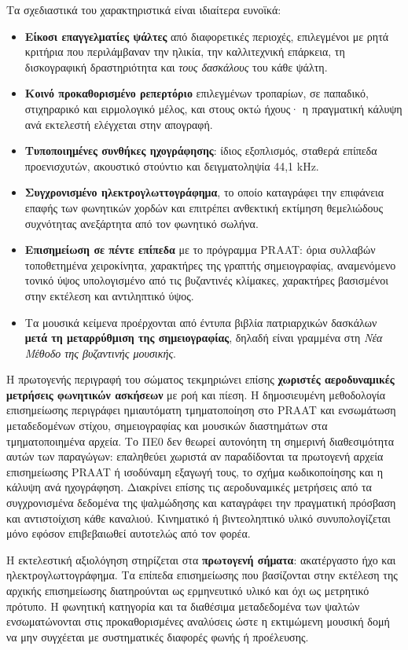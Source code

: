 \documentclass[11pt,a4paper]{article}
\begin{document}
Τα σχεδιαστικά του χαρακτηριστικά είναι ιδιαίτερα ευνοϊκά:
\begin{itemize}
\item \textbf{Είκοσι επαγγελματίες ψάλτες} από διαφορετικές περιοχές, επιλεγμένοι με ρητά κριτήρια που περιλάμβαναν την ηλικία, την καλλιτεχνική επάρκεια, τη δισκογραφική δραστηριότητα και \emph{τους δασκάλους} του κάθε ψάλτη.
\item \textbf{Κοινό προκαθορισμένο ρεπερτόριο} επιλεγμένων τροπαρίων, σε παπαδικό, στιχηραρικό και ειρμολογικό μέλος, και στους οκτώ ήχους· η πραγματική κάλυψη ανά εκτελεστή ελέγχεται στην απογραφή.
\item \textbf{Τυποποιημένες συνθήκες ηχογράφησης}: ίδιος εξοπλισμός, σταθερά επίπεδα προενισχυτών, ακουστικό στούντιο και δειγματοληψία 44,1 kHz.
\item \textbf{Συγχρονισμένο ηλεκτρογλωττογράφημα}, το οποίο καταγράφει την επιφάνεια επαφής των φωνητικών χορδών και επιτρέπει ανθεκτική εκτίμηση θεμελιώδους συχνότητας ανεξάρτητα από τον φωνητικό σωλήνα.
\item \textbf{Επισημείωση σε πέντε επίπεδα} με το πρόγραμμα PRAAT: όρια συλλαβών τοποθετημένα χειροκίνητα, χαρακτήρες της γραπτής σημειογραφίας, αναμενόμενο τονικό ύψος υπολογισμένο από τις βυζαντινές κλίμακες, χαρακτήρες βασισμένοι στην εκτέλεση και αντιληπτικό ύψος.
\item Τα μουσικά κείμενα προέρχονται από έντυπα βιβλία πατριαρχικών δασκάλων \textbf{μετά τη μεταρρύθμιση της σημειογραφίας}, δηλαδή είναι γραμμένα στη \emph{Νέα Μέθοδο της βυζαντινής μουσικής}.
\end{itemize}

Η πρωτογενής περιγραφή του σώματος τεκμηριώνει επίσης \textbf{χωριστές αεροδυναμικές μετρήσεις φωνητικών ασκήσεων} με ροή και πίεση. Η δημοσιευμένη μεθοδολογία επισημείωσης περιγράφει ημιαυτόματη τμηματοποίηση στο PRAAT και ενσωμάτωση μεταδεδομένων στίχου, σημειογραφίας και μουσικών διαστημάτων στα τμηματοποιημένα αρχεία. Το ΠΕ0 δεν θεωρεί αυτονόητη τη σημερινή διαθεσιμότητα αυτών των παραγώγων: επαληθεύει χωριστά αν παραδίδονται τα πρωτογενή αρχεία επισημείωσης PRAAT ή ισοδύναμη εξαγωγή τους, το σχήμα κωδικοποίησης και η κάλυψη ανά ηχογράφηση. Διακρίνει επίσης τις αεροδυναμικές μετρήσεις από τα συγχρονισμένα δεδομένα της ψαλμώδησης και καταγράφει την πραγματική πρόσβαση και αντιστοίχιση κάθε καναλιού. Κινηματικό ή βιντεοληπτικό υλικό συνυπολογίζεται μόνο εφόσον επιβεβαιωθεί αυτοτελώς από τον φορέα.

Η εκτελεστική αξιολόγηση στηρίζεται στα \textbf{πρωτογενή σήματα}: ακατέργαστο ήχο και ηλεκτρογλωττογράφημα. Τα επίπεδα επισημείωσης που βασίζονται στην εκτέλεση της αρχικής επισημείωσης διατηρούνται ως ερμηνευτικό υλικό και όχι ως μετρητικό πρότυπο. Η φωνητική κατηγορία και τα διαθέσιμα μεταδεδομένα των ψαλτών ενσωματώνονται στις προκαθορισμένες αναλύσεις ώστε η εκτιμώμενη μουσική δομή να μην συγχέεται με συστηματικές διαφορές φωνής ή προέλευσης.
\end{document}

